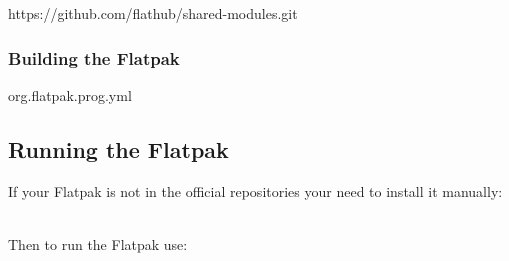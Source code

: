 {\footnotesize{
\begin{script}
 
   https://github.com/flathub/shared-modules.git
\end{script}
}}
\newpage

\subsubsection{Building the Flatpak}

{\footnotesize{
\begin{script}
org.flatpak.prog.yml
   
\end{script}
}}

\subsection{Running the Flatpak}

If your Flatpak is not in the official repositories your need to install it manually:
{\scriptsize{
\begin{script}
     
\end{script}
}}
\\[-0.25cm]
\noindent Then to run the Flatpak use:
{\scriptsize{
\begin{script}
    
\end{script}
}}


